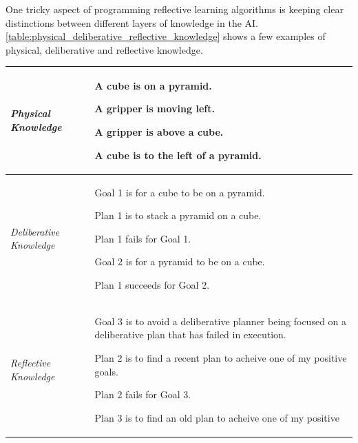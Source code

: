 One tricky aspect of programming reflective learning algorithms is
keeping clear distinctions between different layers of knowledge in
the AI.  {\autoref{table:physical_deliberative_reflective_knowledge}}
shows a few examples of physical, deliberative and reflective
knowledge.
\begin{table}
\centering
\begin{tabular}{|p{2cm}|p{8cm}|}
\hline \emph{Physical Knowledge} & \begin{packed_itemize}
\item{A cube is on a pyramid.}
\item{A gripper is moving left.}
\item{A gripper is above a cube.}
\item{A cube is to the left of a pyramid.}
\end{packed_itemize} \\
\hline \emph{Deliberative Knowledge} & \begin{packed_itemize}
\item{Goal 1 is for a cube to be on a pyramid.}
\item{Plan 1 is to stack a pyramid on a cube.}
\item{Plan 1 fails for Goal 1.}
\item{Goal 2 is for a pyramid to be on a cube.}
\item{Plan 1 succeeds for Goal 2.}
\end{packed_itemize} \\
\hline \emph{Reflective Knowledge}   & \begin{packed_itemize}
\item{Goal 3 is to avoid a deliberative planner being focused on a
  deliberative plan that has failed in execution.}
\item{Plan 2 is to find a recent plan to acheive one of my positive
  goals.}
\item{Plan 2 fails for Goal 3.}
\item{Plan 3 is to find an old plan to acheive one of my positive
}
\end{packed_itemize}
\end{tabular}
\end{table}
